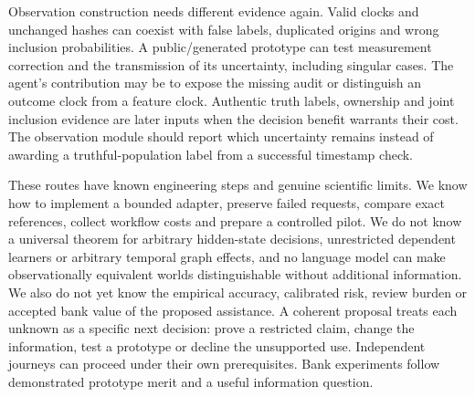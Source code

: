 Observation construction needs different evidence again. Valid clocks and
unchanged hashes can coexist with false labels, duplicated origins and wrong
inclusion probabilities. A public/generated prototype can test measurement
correction and the transmission of its uncertainty, including singular cases.
The agent's contribution may be to expose the missing audit or distinguish an
outcome clock from a feature clock. Authentic truth labels, ownership and joint
inclusion evidence are later inputs when the decision benefit warrants their
cost. The observation module should report which uncertainty remains instead
of awarding a truthful-population label from a successful timestamp check.
\citep{exec14_l8_design}

These routes have known engineering steps and genuine scientific limits. We
know how to implement a bounded adapter, preserve failed requests, compare exact
references, collect workflow costs and prepare a controlled pilot. We do not
know a universal theorem for arbitrary hidden-state decisions, unrestricted
dependent learners or arbitrary temporal graph effects, and no language model
can make observationally equivalent worlds distinguishable without additional
information. We also do not yet know the empirical accuracy, calibrated risk,
review burden or accepted bank value of the proposed assistance. A coherent
proposal treats each unknown as a specific next decision: prove a restricted
claim, change the information, test a prototype or decline the unsupported
use. Independent journeys can proceed under their own prerequisites. Bank
experiments follow demonstrated prototype merit and a useful information
question. \citep{exec14_l8_design}

\label{exec14:l8-development-end}
